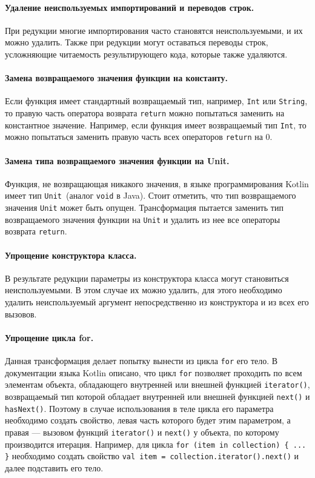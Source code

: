\paragraph{Удаление неиспользуемых импортирований и переводов строк.} При редукции многие импортирования часто становятся неиспользуемыми, и их можно удалить. Также при редукции могут оставаться переводы строк, усложняющие читаемость результирующего кода, которые также удаляются.

\paragraph{Замена возвращаемого значения функции на константу.} Если функция имеет стандартный возвращаемый тип, например, \texttt{Int} или \texttt{String}, то правую часть оператора возврата \texttt{return} можно попытаться заменить на константное значение. Например, если функция имеет возвращаемый тип \texttt{Int}, то можно попытаться заменить правую часть всех операторов \texttt{return} на 0.

\paragraph{Замена типа возвращаемого значения функции на Unit.} Функция, не возвращающая никакого значения, в языке программирования Kotlin имеет тип \texttt{Unit}~(аналог \texttt{void} в Java). Стоит отметить, что тип возвращаемого значения \texttt{Unit} может быть опущен. Трансформация пытается заменить тип возвращаемого значения функции на \texttt{Unit} и удалить из нее все операторы возврата \texttt{return}.

\paragraph{Упрощение конструктора класса.} В результате редукции параметры из конструктора класса могут становиться неиспользуемыми. В этом случае их можно удалить, для этого необходимо удалить неиспользуемый аргумент непосредственно из конструктора и из всех его вызовов.

\paragraph{Упрощение цикла for.} Данная трансформация делает попытку вынести из цикла \texttt{for} его тело. В документации языка Kotlin описано, что цикл \texttt{for} позволяет проходить по всем элементам объекта, обладающего внутренней или внешней функцией \texttt{iterator()}, возвращаемый тип которой обладает внутренней или внешней функцией \texttt{next()} и \texttt{hasNext()}. Поэтому в случае использования в теле цикла его параметра необходимо создать свойство, левая часть которого будет этим параметром, а правая --- вызовом функций \texttt{iterator()} и \texttt{next()} у объекта, по которому производится итерация. Например, для цикла \texttt{for (item in collection) \{ ... \}} необходимо создать свойство \texttt{val item = collection.iterator().next()} и далее подставить его тело.

